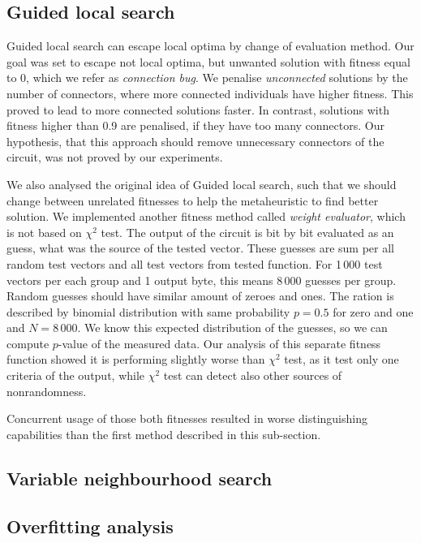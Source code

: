 \documentclass[
  print, %
  Table,   %
  nolof,     %
  nolot,     %
  11pt, %
  oneside  %
]{fithesis3}
\begin{document}
\subsection{Guided local search}
\label{subsec:res-ss-gls}

Guided local search can escape local optima by change of evaluation method. Our goal was set to escape not local optima, but unwanted solution with fitness equal to 0, which we refer as \textit{connection bug}. We penalise \textit{unconnected} solutions by the number of connectors, where more connected individuals have higher fitness. This proved to lead to more connected solutions faster. In contrast, solutions with fitness higher than 0.9 are penalised, if they have too many connectors. Our hypothesis, that this approach should remove unnecessary connectors of the circuit, was not proved by our experiments.

We also analysed the original idea of Guided local search, such that we should change between unrelated fitnesses to help the metaheuristic to find better solution. We implemented another fitness method called \textit{weight evaluator}, which is not based on $\chi^{2}$ test. The output of the circuit is bit by bit evaluated as an guess, what was the source of the tested vector. These guesses are sum per all random test vectors and all test vectors from tested function. For 1\,000 test vectors per each group and 1 output byte, this means 8\,000 guesses per group. Random guesses should have similar amount of zeroes and ones. The ration is described by binomial distribution with same probability $p = 0.5$ for zero and one and $N = 8\,000$. We know this expected distribution of the guesses, so we can compute $p$-value of the measured data. Our analysis of this separate fitness function showed it is performing slightly worse than $\chi^{2}$ test, as it test only one criteria of the output, while $\chi^{2}$ test can detect also other sources of nonrandomness.

Concurrent usage of those both fitnesses resulted in worse distinguishing capabilities than the first method described in this sub-section.



\subsection{Variable neighbourhood search}
\label{subsec:res-ss-vns}


\subsection{Overfitting analysis}
\label{subsec:res-ss-overfitting}
\end{document}
